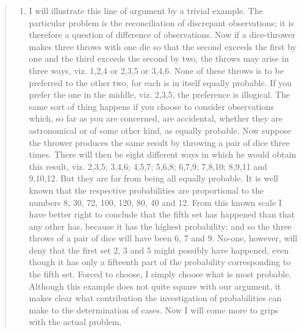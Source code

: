 \documentclass[]{book}
\providecommand{\tightlist}{%
  \setlength{\itemsep}{0pt}\setlength{\parskip}{0pt}}
\begin{document}
\begin{quote}
\begin{enumerate}
\def\labelenumi{\arabic{enumi}.}
\setcounter{enumi}{8}
\tightlist
\item
  I will illustrate this line of argument by a trivial example. The particular problem is the reconciliation of discrepant observations; it is therefore a question of difference of observations. Now if a dice-thrower makes three throws with one die so that the second exceeds the first by one and the third exceeds the second by two, the throws may arise in three ways, viz. 1,2,4 or 2,3,5 or 3,4,6. None of these throws is to be preferred to the other two, for each is in itself equally probable. If you prefer the one in the middle, viz. 2,3,5, the preference is illogical. The same sort of thing happens if you choose to consider observations which, so far as you are concerned, are accidental, whether they are astronomical or of some other kind, as equally probable. Now suppose the thrower produces the same result by throwing a pair of dice three times. There will then be eight different ways in which he would obtain this result, viz. 2,3,5; 3,4,6; 4,5,7; 5,6,8; 6,7,9; 7,8,10; 8,9,11 and 9,10,12.
  But they are far from being all equally probable. It is well known that the respective probabilities are proportional to the numbers 8, 30, 72, 100, 120, 80, 40 and 12. From this known scale I have better right to conclude that the fifth set has happened than that any other has, because it has the highest probability; and so the three throws of a pair of dice will have been 6, 7 and 9. No-one, however, will deny that the first set 2, 3 and 5 might possibly have happened, even though it has only a fifteenth part of the probability corresponding to the fifth set. Forced to choose, I simply choose what is most probable. Although this example does not quite square with our argument, it makes clear what contribution the investigation of probabilities can make to the determination of cases. Now I will come more to grips with the actual problem.
\end{enumerate}
\end{quote}
\end{document}
